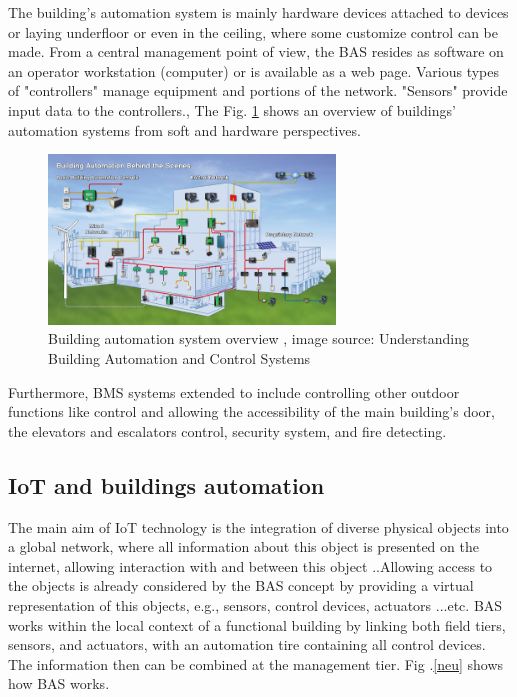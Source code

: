 \documentclass[conference]{IEEEtran}
\begin{document}
The building's automation system is mainly hardware devices attached to devices or laying underfloor or even in the ceiling, where some customize control can be made. From a central management point of view, the BAS resides as software on an operator workstation (computer) or is available as a web page. Various types of "controllers" manage equipment and portions of the network. "Sensors" provide input data to the controllers.\cite{control}\cite{art}, The Fig. \ref{BAS} shows an overview of buildings' automation systems from soft and hardware perspectives. 



\begin{figure}[h!]
	\centering
	\includegraphics[width=3in]{BAS.png}
	\caption{\label{BAS}  Building automation system overview
		, image source: Understanding Building Automation and Control Systems
		\cite{art} }
\end{figure}

Furthermore, BMS systems extended to include controlling other outdoor functions like control and allowing the accessibility of the main building's door, the elevators and escalators control, security system, and fire detecting. 
 
 \subsection{IoT and buildings automation }
 

 The main aim of IoT technology is the integration of diverse physical objects into a global network, where all information about this object is presented on the internet, allowing interaction with and between this object ..Allowing access to the objects is already considered by the BAS concept by providing a virtual representation of this objects, e.g., sensors, control devices, actuators ...etc. BAS works within the local context of a functional building by linking both field tiers, sensors, and actuators, with an automation tire containing all control devices. The information then can be combined at the management tier. Fig .\ref{neu} shows  how BAS works. 
\end{document}
